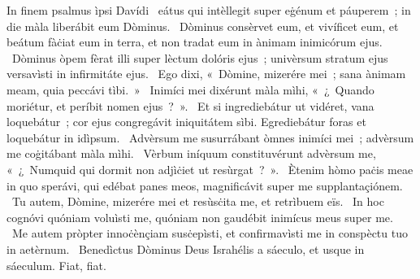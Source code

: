 { In finem psalmus ìpsi Davídi}
{%
~eátus qui intèllegit super eġénum et páuperem~; in die màla liberábit eum Dòminus. 
~Dòminus consèrvet eum, et vivíficet eum, et beátum fàċiat eum in terra, et non tradat eum in ànimam inimicórum ejus. 
~Dòminus òpem fèrat illi super lèctum dolóris ejus~; univèrsum stratum ejus versavìsti in infirmitáte ejus. 
~Ego dixi, «~Dòmine, mizerére mei~; sana ànimam meam, quia peccávi tìbi.~»
~Inimíci mei dixérunt màla mìhi, «~¿~Quando moriétur, et períbit nomen ejus~?~». 
~Et si ingrediebátur ut vidéret, vana loquebátur~; cor ejus congregávit iniquitátem sìbi. Egrediebátur foras et loquebátur in idìpsum. 
~Advèrsum me susurrábant òmnes inimíci mei~; advèrsum me coġitábant màla mìhi. 
~Vèrbum iníquum constituvérunt advèrsum me, «~¿~Numquid qui dormit non adjìċiet ut resùrgat~?~». 
~Ètenim hòmo paċis meae in quo sperávi, qui edébat panes meos, magnificávit super me supplantaçiónem. 
~Tu autem, Dòmine, mizerére mei et resùsċita me, et retrìbuem eïs. 
~In hoc cognóvi quóniam voluìsti me, quóniam non gaudébit inimícus meus super me. 
~Me autem pròpter innoċènçiam susċepìsti, et confirmavìsti me in conspèctu tuo in aetèrnum. 
~Benedìctus Dòminus Deus Israhélis a sáeculo, et usque in sáeculum. Fiat, fiat. 
}
